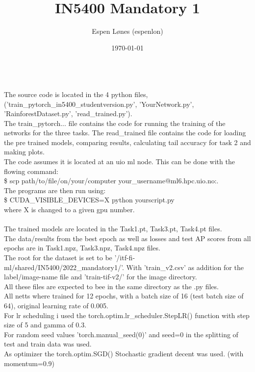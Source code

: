 \documentclass[12pt, letterpaper, twoside]{article}
\begin{document}
\title{IN5400 Mandatory 1}
\author{Espen Lønes (espenlon)}
\date{\today}
\maketitle
\ \\
The source code is located in the 4 python files,\\ ('train\_pytorch\_in5400\_studentversion.py', 'YourNetwork.py', 'RainforestDataset.py', 'read\_trained.py').\\
The train\_pytorch... file contains the code for running the training of the networks for the three tasks. The read\_trained file contains the code for loading the pre trained models, comparing results, calculating tail accuracy for task 2 and making plots.\\
The code assumes it is located at an uio ml node. This can be done with the flowing command:\\
\$ scp path/to/file/on/your/computer your\_username@ml6.hpc.uio.no:.\\
The programs are then run using:\\
\$ CUDA\_VISIBLE\_DEVICES=X python yourscript.py\\
where X is changed to a given gpu number.\\
\ \\
The trained models are located in the Task1.pt, Task3.pt, Task4.pt files.\\
The data/results from the best epoch as well as losses and test AP scores from all epochs are in Task1.npz, Task3.npz, Task4.npz files.\\
The root for the dataset is set to be '/itf-fi-ml/shared/IN5400/2022\_mandatory1/'. With 'train\_v2.csv' as addition for the label/image-name file and 'train-tif-v2/' for the image directory.\\
All these files are expected to bee in the same directory as the .py files.\\
All netts where trained for 12 epochs, with a batch size of 16 (test batch size of 64), original learning rate of 0.005.\\
For lr scheduling i used the torch.optim.lr\_scheduler.StepLR() function with step size of 5 and gamma of 0.3.\\
For random seed values 'torch.manual\_seed(0)' and seed=0 in the splitting of test and train data was used.\\
As optimizer the torch.optim.SGD() Stochastic gradient decent was used. (with momentum=0.9)\\
\end{document}
